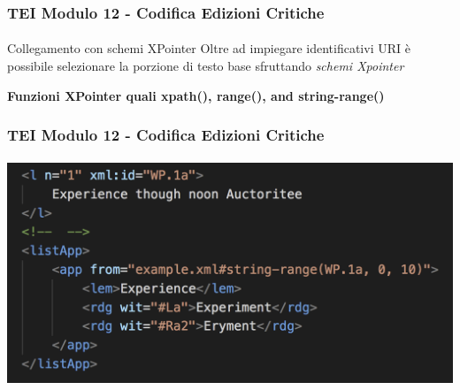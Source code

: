 \begin{frame}
    \frametitle{TEI Modulo 12 - Codifica Edizioni Critiche}
    \framesubtitle{}
    \addtocounter{nframe}{1}
    


    \begin{block}{Collegamento con schemi XPointer}
       Oltre ad impiegare identificativi URI è possibile selezionare la porzione di testo base sfruttando \textit{schemi Xpointer}
    \end{block}
    \textbf{Funzioni XPointer quali xpath(), range(), and string-range()}

\end{frame}



\begin{frame}
    \frametitle{TEI Modulo 12 - Codifica Edizioni Critiche}
    \framesubtitle{}
    \addtocounter{nframe}{1}




    
    \begin{center}
       \includegraphics[width=.95\textwidth]{imgs/app-xpointer.png}
    \end{center}
   
\end{frame}



